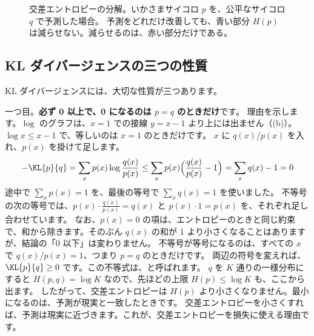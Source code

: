 \begin{figure}[tbp]
\centering
{}
\caption{交差エントロピーの分解。いかさまサイコロ $p$ を、公平なサイコロ $q$ で予測した場合。
予測をどれだけ改善しても、青い部分 $H(p)$ は減らせない。減らせるのは、赤い部分だけである。}
\label{fig:math-decomp}
\end{figure}

\subsection*{KL ダイバージェンスの三つの性質}

KL ダイバージェンスには、大切な性質が三つあります。

一つ目。\textbf{必ず 0 以上で、0 になるのは $p=q$ のときだけ}です。
理由を示します。$\log$ のグラフは、$x=1$ での接線 $y=x-1$ より上には出ません（(b)）。
$\log x\le x-1$ で、等しいのは $x=1$ のときだけです。
$x$ に $q(x)/p(x)$ を入れ、$p(x)$ を掛けて足します。
\begin{equation}
-\KL{p}{q}=\sum_{x}p(x)\log\frac{q(x)}{p(x)}\le\sum_{x}p(x)\Bigl(\frac{q(x)}{p(x)}-1\Bigr)=\sum_{x}q(x)-1=0
\label{eq:math-gibbs}
\end{equation}
途中で $\sum_x p(x)=1$ を、最後の等号で $\sum_x q(x)=1$ を使いました。
不等号の次の等号では、$p(x)\cdot\frac{q(x)}{p(x)}=q(x)$ と $p(x)\cdot 1=p(x)$ を、それぞれ足し合わせています。
なお、$p(x)=0$ の項は、エントロピーのときと同じ約束で、和から除きます。そのぶん $q(x)$ の和が 1 より小さくなることはありますが、結論の「0 以下」は変わりません。
不等号が等号になるのは、すべての $x$ で $q(x)/p(x)=1$、つまり $p=q$ のときだけです。
両辺の符号を変えれば、$\KL{p}{q}\ge 0$ です。この不等式は、と呼ばれます。
$q$ を $K$ 通りの一様分布にすると $H(p,q)=\log K$ なので、先ほどの上限 $H(p)\le\log K$ も、ここから出ます。
したがって、交差エントロピーは $H(p)$ より小さくなりません。最小になるのは、予測が現実と一致したときです。
交差エントロピーを小さくすれば、予測は現実に近づきます。これが、交差エントロピーを損失に使える理由です。

